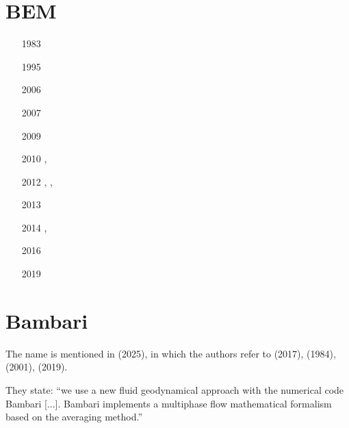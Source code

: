 
\section{BEM} 

\begin{small}
\begin{itemize}
\item[1983] \textcite{crsr83}
\item[1995] \textcite{katl95}
\item[2006] \textcite{more06}
\item[2007] \textcite{moct07}
\item[2009] \textcite{moct09}
\item[2010] \textcite{moyb10}, \textcite{ribe10}
\item[2012] \textcite{qumm12}, \textcite{buqm12}, \textcite{liri12}
\item[2013] \textcite{quhm13}
\item[2014] \textcite{diwl14}, \textcite{lidr14}
\item[2016] \textcite{xuri16}
\item[2019] \textcite{gert19}
\end{itemize}
\end{small}

\section{Bambari} 

The name is mentioned in \textcite{bobs25} (2025),
in which the authors refer to \textcite{bori17} (2017),
\cite{mcke84} (1984), \cite{bers01} (2001), \cite{kesu19} (2019).

They state: ``we use a new fluid geodynamical
approach with the numerical code Bambari [...]. 
Bambari implements a multiphase
flow mathematical formalism based on the averaging method.''




